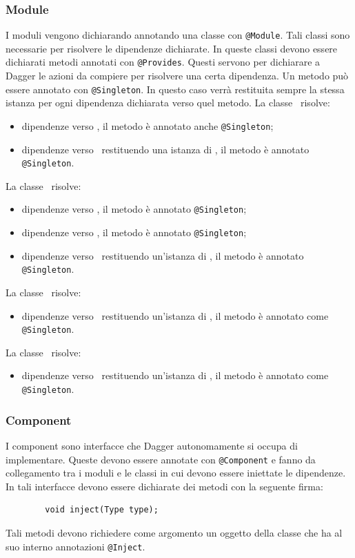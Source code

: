\documentclass[../ManualeSviluppatore.tex]{subfiles}
\begin{document}
	\subsubsection{Module}
	I moduli vengono dichiarando annotando una classe con \lstinline|@Module|. Tali classi sono necessarie per risolvere le dipendenze dichiarate. In queste classi devono essere dichiarati metodi annotati con \lstinline|@Provides|. Questi servono per dichiarare a Dagger le azioni da compiere per risolvere una certa dipendenza. Un metodo può essere annotato con \lstinline|@Singleton|. In questo caso verrà restituita sempre la stessa istanza per ogni dipendenza dichiarata verso quel metodo. 
	La classe \AppModule\ risolve:
	\begin{itemize}
		\item dipendenze verso \Context, il metodo è annotato anche \lstinline|@Singleton|;
		\item dipendenze verso \Application\ restituendo una istanza di \MyApplication, il metodo è annotato \lstinline|@Singleton|.
	\end{itemize}
	La classe \DatabaseModule\ risolve:
	\begin{itemize}
		\item dipendenze verso \SQLiteDaoFactory, il metodo è annotato  \lstinline|@Singleton|;
		\item dipendenze verso \RemoteDaoFactory, il metodo è annotato  \lstinline|@Singleton|;
		\item dipendenze verso \DatabaseAccess\ restituendo un'istanza di \BuildingAccess, il metodo è annotato \lstinline|@Singleton|.
	\end{itemize}
	La classe \InfoModule\ risolve:
	\begin{itemize}
		\item dipendenze verso \InformationManager\ restituendo un'istanza di \InformationManagerImp, il metodo è annotato come \lstinline|@Singleton|.
	\end{itemize}
	La classe \SettingModule\ risolve:
	\begin{itemize}
		\item dipendenze verso \Setting\ restituendo un'istanza di \SettingImp, il metodo è annotato come \lstinline|@Singleton|.
	\end{itemize}

	\subsubsection{Component}
	I component sono interfacce che Dagger autonomamente si occupa di implementare. Queste devono essere annotate con \lstinline|@Component| e fanno da collegamento tra i moduli e le classi in cui devono essere iniettate le dipendenze. In tali interfacce devono essere dichiarate dei metodi con la seguente firma:
	\begin{lstlisting}
		void inject(Type type);
	\end{lstlisting}
	Tali metodi devono richiedere come argomento un oggetto della classe che ha al suo interno annotazioni \lstinline|@Inject|.
	
\end{document}
